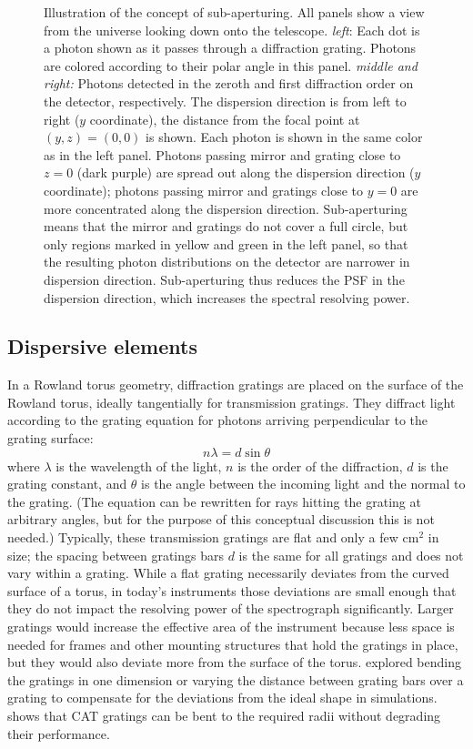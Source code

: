 \documentclass[linenumbers]{aastex631}
\begin{document}
\begin{figure}
\caption{
    Illustration of the concept of sub-aperturing. All panels show a view from the universe looking down onto the telescope. \emph{left}: Each dot is a photon shown as it passes through a diffraction grating. Photons are colored according to their polar angle in this panel. \emph{middle and right:} Photons detected in the zeroth and first diffraction order on the detector, respectively. The dispersion direction is from left to right ($y$ coordinate), the distance from the focal point at $(y, z) = (0, 0)$ is shown. Each photon is shown in the same color as in the left panel. Photons passing mirror and grating close to $z=0$ (dark purple) are spread out along the dispersion direction ($y$ coordinate); photons passing mirror and gratings close to $y=0$ are more concentrated along the dispersion direction. Sub-aperturing means that the mirror and gratings do not cover a full circle, but only regions marked in yellow and green in the left panel, so that the resulting photon distributions on the detector are narrower in dispersion direction. Sub-aperturing thus reduces the PSF in the dispersion direction, which increases the spectral resolving power.}
\label{fig:subaperture}
\end{figure}

\subsection{Dispersive elements}
In a Rowland torus geometry, diffraction gratings are placed on the surface of the Rowland torus, ideally tangentially for transmission gratings. They diffract light according to the grating equation for photons arriving perpendicular to the grating surface:
\begin{equation}
n \lambda = d \sin \theta \label{eqn:diffraction}
\end{equation}
where $\lambda$ is the wavelength of the light, $n$ is the order of the diffraction, $d$ is the grating constant, and $\theta$ is the angle between the incoming light and the normal to the grating. (The equation can be rewritten for rays hitting the grating at arbitrary angles, but for the purpose of this conceptual discussion this is not needed.)
Typically, these transmission gratings are flat and only a few cm$^2$ in size; the spacing between gratings bars $d$ is the same for all gratings and does not vary within a grating. While a flat grating necessarily deviates from the curved surface of a torus, in today's instruments those deviations are small enough that they do not impact the resolving power of the spectrograph significantly. Larger gratings would increase the effective area of the instrument because less space is needed for frames and other mounting structures that hold the gratings in place, but they would also deviate more from the surface of the torus. \citet{2020SPIE11444E..88G} explored bending the gratings in one dimension or varying the distance between grating bars over a grating to compensate for the deviations from the ideal shape in simulations. \citet{2019SPIE11118E..11G} shows that CAT gratings can be bent to the required radii without degrading their performance.
\end{document}
